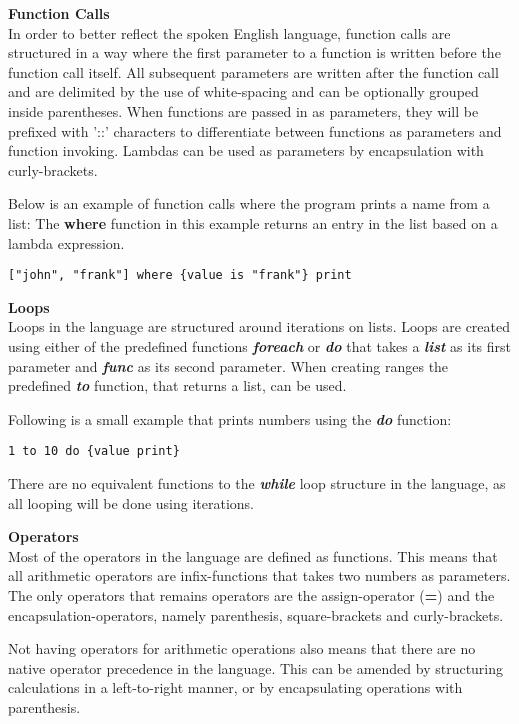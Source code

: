 \textbf{Function Calls}\\
In order to better reflect the spoken English language, function calls are structured in a way where the first parameter to a function is written before the function call itself.
All subsequent parameters are written after the function call and are delimited by the use of white-spacing and can be optionally grouped inside parentheses.
When functions are passed in as parameters, they will be prefixed with '::' characters to differentiate between functions as parameters and function invoking. 
Lambdas can be used as parameters by encapsulation with curly-brackets. 

Below is an example of function calls where the program prints a name from a list:
The \textbf{where} function in this example returns an entry in the list based on a lambda expression.
\begin{lstlisting}
["john", "frank"] where {value is "frank"} print
\end{lstlisting}

\textbf{Loops}\\
Loops in the language are structured around iterations on lists.
Loops are created using either of the predefined functions \textbf{\textit{foreach}} or \textbf{\textit{do}} that takes a \textbf{\textit{list}} as its first parameter and \textbf{\textit{func}} as its second parameter.
When creating ranges the predefined \textbf{\textit{to}} function, that returns a list, can be used. 

Following is a small example that prints numbers using the \textbf{\textit{do}} function:
\begin{lstlisting}
1 to 10 do {value print}
\end{lstlisting}
There are no equivalent functions to the \textbf{\textit{while}} loop structure in the language, as all looping will be done using iterations.

\textbf{Operators}\\
Most of the operators in the language are defined as functions.
This means that all arithmetic operators are infix-functions that takes two numbers as parameters. 
The only operators that remains operators are the assign-operator (\textbf{=}) and the encapsulation-operators, namely parenthesis, square-brackets and curly-brackets.

Not having operators for arithmetic operations also means that there are no native operator precedence in the language.
This can be amended by structuring calculations in a left-to-right manner, or by encapsulating operations with parenthesis. 

